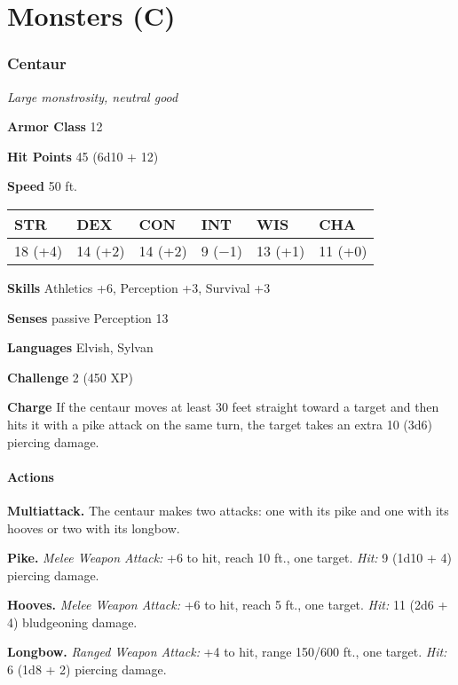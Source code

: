 \documentclass[
]{article}
\date{}
\begin{document}
\hypertarget{monsters-c}{%
\section{Monsters (C)}\label{monsters-c}}

\hypertarget{centaur}{%
\subsubsection{Centaur}\label{centaur}}

\emph{Large monstrosity, neutral good}

\textbf{Armor Class} 12

\textbf{Hit Points} 45 (6d10 + 12)

\textbf{Speed} 50 ft.

\begin{longtable}[]{@{}llllll@{}}
\toprule
STR & DEX & CON & INT & WIS & CHA\tabularnewline
\midrule
\endhead
18 (+4) & 14 (+2) & 14 (+2) & 9 (−1) & 13 (+1) & 11 (+0)\tabularnewline
\bottomrule
\end{longtable}

\textbf{Skills} Athletics +6, Perception +3, Survival +3

\textbf{Senses} passive Perception 13

\textbf{Languages} Elvish, Sylvan

\textbf{Challenge} 2 (450 XP)

\textbf{Charge} If the centaur moves at least 30 feet straight toward a
target and then hits it with a pike attack on the same turn, the target
takes an extra 10 (3d6) piercing damage.

\hypertarget{actions}{%
\paragraph{Actions}\label{actions}}

\textbf{Multiattack.} The centaur makes two attacks: one with its pike
and one with its hooves or two with its longbow.

\textbf{Pike.} \emph{Melee Weapon Attack:} +6 to hit, reach 10 ft., one
target. \emph{Hit:} 9 (1d10 + 4) piercing damage.

\textbf{Hooves.} \emph{Melee Weapon Attack:} +6 to hit, reach 5 ft., one
target. \emph{Hit:} 11 (2d6 + 4) bludgeoning damage.

\textbf{Longbow.} \emph{Ranged Weapon Attack:} +4 to hit, range 150/600
ft., one target. \emph{Hit:} 6 (1d8 + 2) piercing damage.
\end{document}
